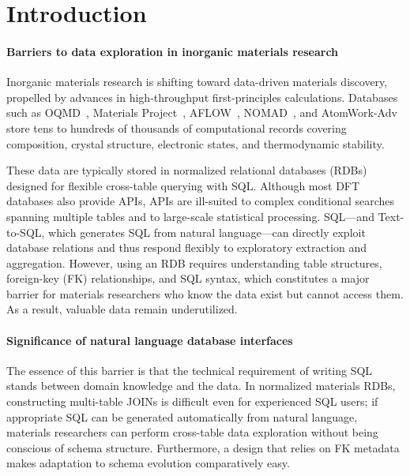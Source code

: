 \section{Introduction}
\label{sec:introduction}

\paragraph*{Barriers to data exploration in inorganic materials research}

Inorganic materials research is shifting toward data-driven materials discovery, propelled by advances in high-throughput first-principles calculations. Databases such as OQMD~\cite{saal2013oqmd,kirklin2015oqmd}, Materials Project~\cite{jain2013mp}, AFLOW~\cite{curtarolo2012aflow}, NOMAD~\cite{draxl2019nomad}, and AtomWork-Adv~\cite{nims2018atomworkadv} store tens to hundreds of thousands of computational records covering composition, crystal structure, electronic states, and thermodynamic stability.

These data are typically stored in normalized relational databases (RDBs) designed for flexible cross-table querying with SQL. Although most DFT databases also provide APIs, APIs are ill-suited to complex conditional searches spanning multiple tables and to large-scale statistical processing. SQL---and Text-to-SQL, which generates SQL from natural language---can directly exploit database relations and thus respond flexibly to exploratory extraction and aggregation. However, using an RDB requires understanding table structures, foreign-key (FK) relationships, and SQL syntax, which constitutes a major barrier for materials researchers who know the data exist but cannot access them. As a result, valuable data remain underutilized.

\paragraph*{Significance of natural language database interfaces}

The essence of this barrier is that the technical requirement of writing SQL stands between domain knowledge and the data. In normalized materials RDBs, constructing multi-table JOINs is difficult even for experienced SQL users; if appropriate SQL can be generated automatically from natural language, materials researchers can perform cross-table data exploration without being conscious of schema structure. Furthermore, a design that relies on FK metadata makes adaptation to schema evolution comparatively easy.

